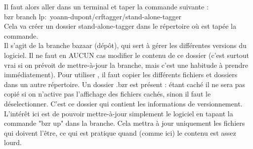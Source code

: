 \documentclass[manual-fr.tex]{subfiles}
\begin{document}
Il faut alors aller dans un terminal et taper la commande suivante :\\

bzr branch lp:~yoann-dupont/crftagger/stand-alone-tagger\\

Cela va créer un dossier stand-alone-tagger dans le répertoire où est tapée la commande. \\

Il s'agit de la branche bazaar (dépôt), qui sert à gérer les différentes
versions du logiciel. Il ne faut en AUCUN cas modifier le contenu de ce
dossier (c'est surtout vrai si on prévoit de mettre-à-jour la branche, mais
c'est une habitude à prendre immédiatement). Pour utiliser \SEM, il faut copier
les différents fichiers et dossiers dans un autre répertoire. Un dossier .bzr
est présent : étant caché il ne sera pas copié si on n'active pas l'affichage
des fichiers cachés, sinon il faut le déselectionner. C'est ce dossier qui
contient les informations de versionnement.\\

L'intérêt ici est de pouvoir mettre-à-jour simplement le logiciel en tapant la
commande "bzr up" dans la branche. Cela mettra à jour uniquement les fichiers
qui doivent l'être, ce qui est pratique quand (comme ici) le contenu est assez
lourd.
\end{document}
